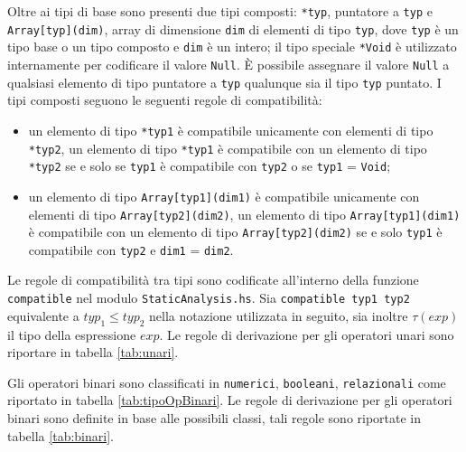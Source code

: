 Oltre ai tipi di base  sono presenti due tipi composti: \texttt{*typ}, puntatore a \texttt{typ} e \texttt{Array[typ](dim)}, array di dimensione \texttt{dim} di elementi di tipo \texttt{typ}, dove \texttt{typ} è un tipo base o un tipo composto e \texttt{dim} è un intero; il tipo speciale \texttt{*Void} è utilizzato internamente per codificare il valore \texttt{Null}. È possibile assegnare il valore \texttt{Null} a qualsiasi elemento di tipo puntatore a \texttt{typ} qualunque sia il tipo \texttt{typ} puntato.
I tipi composti seguono le seguenti regole di compatibilità:
\begin{itemize}
\item un elemento di tipo \texttt{*typ1} è compatibile unicamente con elementi di tipo \texttt{*typ2}, un elemento di tipo \texttt{*typ1} è compatibile con un elemento di tipo \texttt{*typ2} se e solo se \texttt{typ1} è compatibile con \texttt{typ2} o se \texttt{typ1} = \texttt{Void};
\item un elemento di tipo \texttt{Array[typ1](dim1)} è compatibile unicamente con elementi di tipo \texttt{Array[typ2](dim2)}, un elemento di tipo \texttt{Array[typ1](dim1)} è compatibile con un elemento di tipo \texttt{Array[typ2](dim2)} se e solo \texttt{typ1} è compatibile con \texttt{typ2} e \texttt{dim1} = \texttt{dim2}.
\end{itemize}

Le regole di compatibilità tra tipi sono codificate all'interno della funzione \texttt{compatible} nel modulo \texttt{StaticAnalysis.hs}.
Sia \texttt{compatible typ1 typ2} equivalente a $typ_1 \leq typ_2$ nella notazione utilizzata in seguito, sia inoltre $\tau(exp)$ il tipo della espressione $exp$.
Le regole di derivazione per gli operatori unari sono riportare in tabella \ref{tab:unari}.

\begin{table}[]
\caption{Regole di derivazione per gli operatori unari.}
\label{tab:unari}
\end{table}

Gli operatori binari sono classificati in \texttt{numerici}, \texttt{booleani}, \texttt{relazionali} come riportato in tabella \ref{tab:tipoOpBinari}. Le regole di derivazione per gli operatori binari sono definite in base alle possibili classi, tali regole sono riportate in tabella \ref{tab:binari}.

